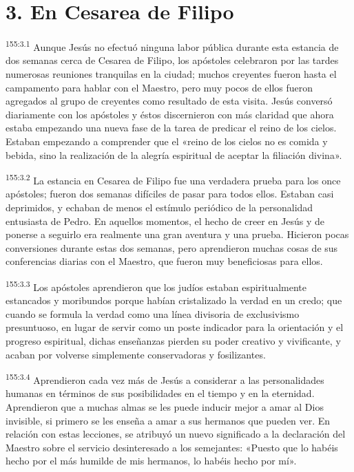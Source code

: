 \section*{3. En Cesarea de Filipo}
\par 
\textsuperscript{155:3.1} Aunque Jesús no efectuó ninguna labor pública durante esta estancia de dos semanas cerca de Cesarea de Filipo, los apóstoles celebraron por las tardes numerosas reuniones tranquilas en la ciudad; muchos creyentes fueron hasta el campamento para hablar con el Maestro, pero muy pocos de ellos fueron agregados al grupo de creyentes como resultado de esta visita. Jesús conversó diariamente con los apóstoles y éstos discernieron con más claridad que ahora estaba empezando una nueva fase de la tarea de predicar el reino de los cielos. Estaban empezando a comprender que el «reino de los cielos no es comida y bebida, sino la realización de la alegría espiritual de aceptar la filiación divina».

\par 
\textsuperscript{155:3.2} La estancia en Cesarea de Filipo fue una verdadera prueba para los once apóstoles; fueron dos semanas difíciles de pasar para todos ellos. Estaban casi deprimidos, y echaban de menos el estímulo periódico de la personalidad entusiasta de Pedro. En aquellos momentos, el hecho de creer en Jesús y de ponerse a seguirlo era realmente una gran aventura y una prueba. Hicieron pocas conversiones durante estas dos semanas, pero aprendieron muchas cosas de sus conferencias diarias con el Maestro, que fueron muy beneficiosas para ellos.

\par 
\textsuperscript{155:3.3} Los apóstoles aprendieron que los judíos estaban espiritualmente estancados y moribundos porque habían cristalizado la verdad en un credo; que cuando se formula la verdad como una línea divisoria de exclusivismo presuntuoso, en lugar de servir como un poste indicador para la orientación y el progreso espiritual, dichas enseñanzas pierden su poder creativo y vivificante, y acaban por volverse simplemente conservadoras y fosilizantes.

\par 
\textsuperscript{155:3.4} Aprendieron cada vez más de Jesús a considerar a las personalidades humanas en términos de sus posibilidades en el tiempo y en la eternidad. Aprendieron que a muchas almas se les puede inducir mejor a amar al Dios invisible, si primero se les enseña a amar a sus hermanos que pueden ver. En relación con estas lecciones, se atribuyó un nuevo significado a la declaración del Maestro sobre el servicio desinteresado a los semejantes: «Puesto que lo habéis hecho por el más humilde de mis hermanos, lo habéis hecho por mí».

